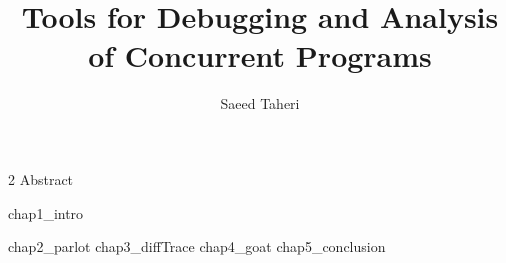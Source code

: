 \documentclass[11pt,Chicago]{uuthesis2e}
\author                 {Saeed Taheri}
\title                  {Tools for Debugging and Analysis of Concurrent Programs}
\begin{document}


\frontmatterformat
\titlepage
\copyrightpage
\dissertationapproval
\setcounter {page}     {2}             %
 {Abstract}
\dedicationpage
\tableofcontents
\listoffigures
\listoftables
%





\maintext       %

\pagestyle{headings} %

 {chap1_intro}

 {chap2_parlot}
 {chap3_diffTrace}
 {chap4_goat}
 {chap5_conclusion}


\end{document}
